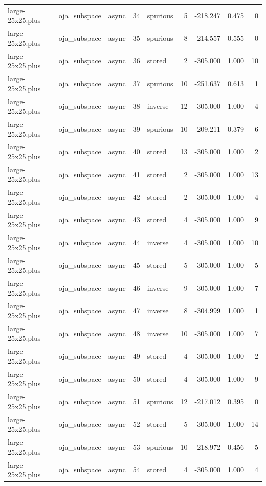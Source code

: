 \begin{tabular}{lllrlrrrr}
large-25x25.plus & oja\_subspace & async & 34 & spurious & 5 & -218.247 & 0.475 & 0 \\
large-25x25.plus & oja\_subspace & async & 35 & spurious & 8 & -214.557 & 0.555 & 0 \\
large-25x25.plus & oja\_subspace & async & 36 & stored & 2 & -305.000 & 1.000 & 10 \\
large-25x25.plus & oja\_subspace & async & 37 & spurious & 10 & -251.637 & 0.613 & 1 \\
large-25x25.plus & oja\_subspace & async & 38 & inverse & 12 & -305.000 & 1.000 & 4 \\
large-25x25.plus & oja\_subspace & async & 39 & spurious & 10 & -209.211 & 0.379 & 6 \\
large-25x25.plus & oja\_subspace & async & 40 & stored & 13 & -305.000 & 1.000 & 2 \\
large-25x25.plus & oja\_subspace & async & 41 & stored & 2 & -305.000 & 1.000 & 13 \\
large-25x25.plus & oja\_subspace & async & 42 & stored & 2 & -305.000 & 1.000 & 4 \\
large-25x25.plus & oja\_subspace & async & 43 & stored & 4 & -305.000 & 1.000 & 9 \\
large-25x25.plus & oja\_subspace & async & 44 & inverse & 4 & -305.000 & 1.000 & 10 \\
large-25x25.plus & oja\_subspace & async & 45 & stored & 5 & -305.000 & 1.000 & 5 \\
large-25x25.plus & oja\_subspace & async & 46 & inverse & 9 & -305.000 & 1.000 & 7 \\
large-25x25.plus & oja\_subspace & async & 47 & inverse & 8 & -304.999 & 1.000 & 1 \\
large-25x25.plus & oja\_subspace & async & 48 & inverse & 10 & -305.000 & 1.000 & 7 \\
large-25x25.plus & oja\_subspace & async & 49 & stored & 4 & -305.000 & 1.000 & 2 \\
large-25x25.plus & oja\_subspace & async & 50 & stored & 4 & -305.000 & 1.000 & 9 \\
large-25x25.plus & oja\_subspace & async & 51 & spurious & 12 & -217.012 & 0.395 & 0 \\
large-25x25.plus & oja\_subspace & async & 52 & stored & 5 & -305.000 & 1.000 & 14 \\
large-25x25.plus & oja\_subspace & async & 53 & spurious & 10 & -218.972 & 0.456 & 5 \\
large-25x25.plus & oja\_subspace & async & 54 & stored & 4 & -305.000 & 1.000 & 4 \\

\end{tabular}
